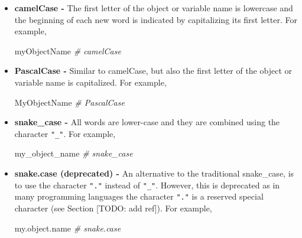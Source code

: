 \documentclass[
  11pt,
]{book}
\newenvironment{Shaded}{\begin{snugshade}}{\end{snugshade}}
\newcommand{\CommentTok}[1]{\textcolor[rgb]{0.56,0.35,0.01}{\textit{#1}}}
\newcommand{\NormalTok}[1]{#1}
\newenvironment{code-tex-good}
  {\begingroup\definecolor{shadecolor}{RGB}{224, 240, 227}}
  {\endgroup}
\newenvironment{code-tex-warn}
  {\begingroup\definecolor{shadecolor}{RGB}{249, 249, 154}}
  {\endgroup}
\begin{document}
\begin{itemize}
\item
  \textbf{camelCase -} The first letter of the object or variable name is lowercase and the beginning of each new word is indicated by capitalizing its first letter. For example,

  \begin{code-tex-good}

\begin{Shaded}
\begin{Highlighting}[]
\NormalTok{myObjectName       }\CommentTok{\# camelCase}
\end{Highlighting}
\end{Shaded}

  \end{code-tex-good}
\item
  \textbf{PascalCase -} Similar to camelCase, but also the first letter of the object or variable name is capitalized. For example,

  \begin{code-tex-good}

\begin{Shaded}
\begin{Highlighting}[]
\NormalTok{MyObjectName        }\CommentTok{\# PascalCase}
\end{Highlighting}
\end{Shaded}

  \end{code-tex-good}
\item
  \textbf{snake\_case -} All words are lower-case and they are combined using the character \texttt{"\_"}. For example,

  \begin{code-tex-good}

\begin{Shaded}
\begin{Highlighting}[]
\NormalTok{my\_object\_name      }\CommentTok{\# snake\_case}
\end{Highlighting}
\end{Shaded}

  \end{code-tex-good}
\item
  \textbf{snake.case (deprecated) -} An alternative to the traditional snake\_case, is to use the character \texttt{"."} instead of \texttt{"\_"}. However, this is deprecated as in many programming languages the character \texttt{"."} is a reserved special character (see Section {[}TODO: add ref{]}). For example,

  \begin{code-tex-warn}

\begin{Shaded}
\begin{Highlighting}[]
\NormalTok{my.object.name      }\CommentTok{\# snake.case}
\end{Highlighting}
\end{Shaded}

  \end{code-tex-warn}
\end{itemize}
\end{document}
